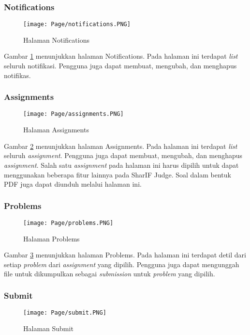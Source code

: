 \subsubsection{Notifications}
    \begin{figure}[H]
    	\centering  
    	\texttt{[image: Page/notifications.PNG]}  
    	\caption{Halaman Notifications}
    	\label{fig:3:notifications} 
    \end{figure} 
    
    Gambar \ref{fig:3:notifications} menunjukkan halaman Notifications. Pada halaman ini terdapat \textit{list} seluruh notifikasi. Pengguna juga dapat membuat, mengubah, dan menghapus notifikas.

\subsubsection{Assignments}
    \begin{figure}[H]
    	\centering  
    	\texttt{[image: Page/assignments.PNG]}  
    	\caption{Halaman Assignments}
    	\label{fig:3:assignments} 
    \end{figure} 
    
    Gambar \ref{fig:3:assignments} menunjukkan halaman Assignments. Pada halaman ini terdapat \textit{list} seluruh \textit{assignment}. Pengguna juga dapat membuat, mengubah, dan menghapus \textit{assignment}. Salah satu \textit{assignment} pada halaman ini harus dipilih untuk dapat menggunakan beberapa fitur lainnya pada SharIF Judge. Soal dalam bentuk PDF juga dapat diunduh melalui halaman ini. 
    
\subsubsection{Problems}
    \begin{figure}[H]
    	\centering  
    	\texttt{[image: Page/problems.PNG]}  
    	\caption{Halaman Problems}
    	\label{fig:3:problems} 
    \end{figure} 
    
    Gambar \ref{fig:3:problems} menunjukkan halaman Problems. Pada halaman ini terdapat detil dari setiap \textit{problem} dari \textit{assignment} yang dipilih. Pengguna juga dapat mengunggah file untuk dikumpulkan sebagai \textit{submission} untuk \textit{problem} yang dipilih.
    
\subsubsection{Submit}
    \begin{figure}[H]
    	\centering  
    	\texttt{[image: Page/submit.PNG]}  
    	\caption{Halaman Submit}
    	\label{fig:3:submit} 
    \end{figure} 
    
